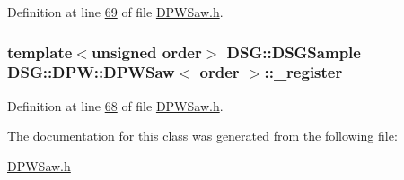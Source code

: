 Definition at line \hyperlink{_d_p_w_saw_8h_source_l00069}{69} of file \hyperlink{_d_p_w_saw_8h_source}{D\+P\+W\+Saw.\+h}.

\hypertarget{class_d_s_g_1_1_d_p_w_1_1_d_p_w_saw_a5b9fcbe7361f56358afd2728c5de4014}{
\subsubsection[{\+\_\+register}]{\setlength{\rightskip}{0pt plus 5cm}template$<$unsigned order$>$ {\bf D\+S\+G\+::\+D\+S\+G\+Sample} {\bf D\+S\+G\+::\+D\+P\+W\+::\+D\+P\+W\+Saw}$<$ order $>$\+::\+\_\+register\hspace{0.3cm}{\ttfamily [protected]}}}\label{class_d_s_g_1_1_d_p_w_1_1_d_p_w_saw_a5b9fcbe7361f56358afd2728c5de4014}


Definition at line \hyperlink{_d_p_w_saw_8h_source_l00068}{68} of file \hyperlink{_d_p_w_saw_8h_source}{D\+P\+W\+Saw.\+h}.



The documentation for this class was generated from the following file\+:\begin{DoxyCompactItemize}
\item 
\hyperlink{_d_p_w_saw_8h}{D\+P\+W\+Saw.\+h}\end{DoxyCompactItemize}
